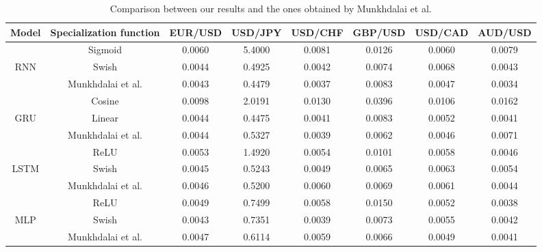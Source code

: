 \documentclass{ieeeaccess}
\begin{document}
\begin{table}[t]
  \caption{Comparison between our results and the ones obtained by Munkhdalai et al.}
  \scriptsize
  \centering
  \begin{tabular*}{0.9\textwidth}{c @{\extracolsep{\fill}} ccccccc}
    \hline
    \textbf{Model} & \textbf{Specialization function} & \textbf{EUR/USD} & \textbf{USD/JPY} & \textbf{USD/CHF} & \textbf{GBP/USD} & \textbf{USD/CAD} & \textbf{AUD/USD} \\
    \hline

          & Sigmoid & 0.0060 & 5.4000 & 0.0081 & 0.0126 & 0.0060 & 0.0079 \\
    RNN   & Swish & 0.0044 & 0.4925 & 0.0042 & 0.0074 & 0.0068 & 0.0043 \\
          & Munkhdalai et al. & 0.0043 & 0.4479 & 0.0037 & 0.0083 & 0.0047 & 0.0034 \\
    \hline
          & Cosine & 0.0098 & 2.0191 & 0.0130 & 0.0396 & 0.0106 & 0.0162 \\
    GRU   & Linear & 0.0044 & 0.4475 & 0.0041 & 0.0083 & 0.0052 & 0.0041 \\
          & Munkhdalai et al. & 0.0044 & 0.5327 & 0.0039 & 0.0062 & 0.0046 & 0.0071 \\
    \hline
          & ReLU & 0.0053 & 1.4920 & 0.0054 & 0.0101 & 0.0058 & 0.0046 \\
    LSTM  & Swish & 0.0045 & 0.5243 & 0.0049 & 0.0065 & 0.0063 & 0.0054 \\
          & Munkhdalai et al. & 0.0046 & 0.5200 & 0.0060 & 0.0069 & 0.0061 & 0.0044 \\
    \hline

          & ReLU & 0.0049 & 0.7499 & 0.0058 & 0.0150 & 0.0052 & 0.0038 \\
    MLP   & Swish & 0.0043 & 0.7351 & 0.0039 & 0.0073 & 0.0055 & 0.0042 \\
          & Munkhdalai et al. & 0.0047 & 0.6114 & 0.0059 & 0.0066 & 0.0049 & 0.0041 \\
          


\end{tabular*}
\end{table}
\end{document}
